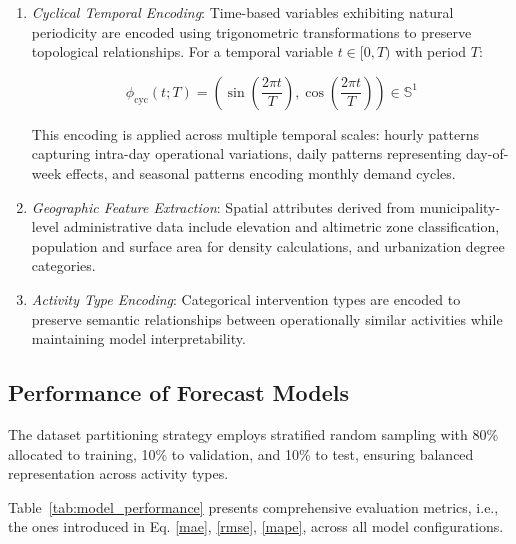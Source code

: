 \documentclass[preprint,12pt]{elsarticle}
\begin{document}
\begin{enumerate}



\item \textit{Cyclical Temporal Encoding}: Time-based variables exhibiting natural periodicity are encoded using trigonometric transformations to preserve topological relationships. For a temporal variable $t \in [0, T)$ with period $T$:

\begin{equation}
\phi_{\text{cyc}}(t; T) = \left(\sin\left(\frac{2\pi t}{T}\right), \cos\left(\frac{2\pi t}{T}\right)\right) \in \mathbb{S}^1
\end{equation}

This encoding is applied across multiple temporal scales: hourly patterns capturing intra-day operational variations, daily patterns representing day-of-week effects, and seasonal patterns encoding monthly demand cycles.

\item \textit{Geographic Feature Extraction}: Spatial attributes derived from municipality-level administrative data include elevation and altimetric zone classification, population and surface area for density calculations, and urbanization degree categories.

\item \textit{Activity Type Encoding}: Categorical intervention types are encoded to preserve semantic relationships between operationally similar activities while maintaining model interpretability.


 \end{enumerate}


\subsection{Performance of Forecast Models}
\label{sec:numerical}

The dataset partitioning strategy employs stratified random sampling with 80\% allocated to training, 10\% to validation, and 10\% to test, ensuring balanced representation across activity types.

Table~\ref{tab:model_performance} presents comprehensive evaluation metrics, i.e., the ones introduced in Eq. \eqref{mae}, \eqref{rmse}, \eqref{mape}, across all model configurations.
\end{document}
